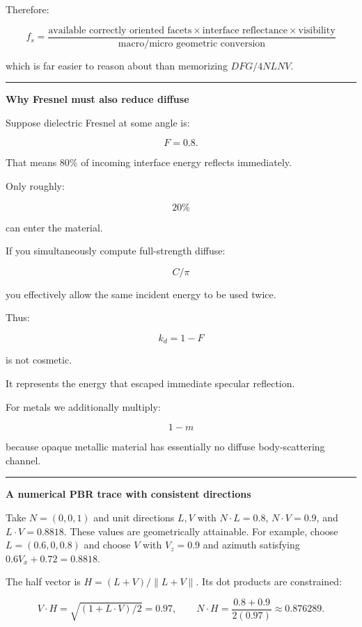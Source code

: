 Therefore:

\[
\boxed{
f_s=
\frac{
\text{available correctly oriented facets}
\times
\text{interface reflectance}
\times
\text{visibility}
}{
\text{macro/micro geometric conversion}
}
}
\]

which is far easier to reason about than memorizing \(DFG/4NLNV\).

\begin{center}\rule{0.5\linewidth}{0.5pt}\end{center}

\textbf{Why Fresnel must also reduce diffuse}

Suppose dielectric Fresnel at some angle is:

\[
F=0.8.
\]

That means 80\% of incoming interface energy reflects immediately.

Only roughly:

\[
20\%
\]

can enter the material.

If you simultaneously compute full-strength diffuse:

\[
C/\pi
\]

you effectively allow the same incident energy to be used twice.

Thus:

\[
k_d=1-F
\]

is not cosmetic.

It represents the energy that escaped immediate specular reflection.

For metals we additionally multiply:

\[
1-m
\]

because opaque metallic material has essentially no diffuse body-scattering channel.

\begin{center}\rule{0.5\linewidth}{0.5pt}\end{center}

\textbf{A numerical PBR trace with consistent directions}

Take \(N=(0,0,1)\) and unit directions \(L,V\) with \(N\cdot L=0.8\), \(N\cdot V=0.9\), and \(L\cdot V=0.8818\). These values are geometrically attainable. For example, choose \(L=(0.6,0,0.8)\) and choose \(V\) with \(V_z=0.9\) and azimuth satisfying \(0.6V_x+0.72=0.8818\).

The half vector is \(H=(L+V)/\|L+V\|\). Its dot products are constrained:

\[
V\cdot H=\sqrt{(1+L\cdot V)/2}=0.97,
\qquad N\cdot H=\frac{0.8+0.9}{2(0.97)}\approx0.876289.
\]

